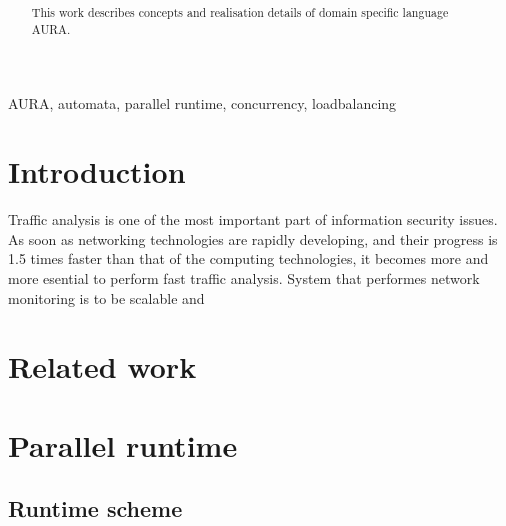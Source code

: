 \documentclass[10pt, conference, compsocconf]{IEEEtran}
\begin{document}
\title{
}

\author{
}


\maketitle
\begin{abstract}
This work describes concepts and realisation details of domain specific
language AURA.

\end{abstract}

\begin{IEEEkeywords}
AURA, automata, parallel runtime, concurrency, loadbalancing
\end{IEEEkeywords}

\section{Introduction}
Traffic analysis is one of the most important part of information
security issues. As soon as networking technologies are rapidly developing, 
and their progress is 1.5 times faster than that of the computing 
technologies, it becomes more and more esential to perform fast traffic
analysis. System that performes network monitoring is to be scalable and



\section{Related work}


\section{Parallel runtime}
\subsection{Runtime scheme}
\end{document}
